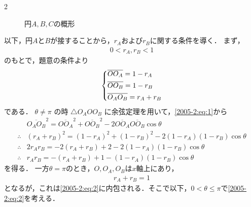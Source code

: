 \documentclass[../../main.tex]{subfiles}
\begin{document}
\begin{multicols}{2}
\begin{figure}[H]
    \caption{円$A,B,C$の概形}
  \end{figure}

  以下，円$A$と$B$が接することから，$r_A$および$r_B$に関する条件を導く．
  まず，
  \begin{align*}
    0 < r_A, r_B < 1
  \end{align*}
  のもとで，題意の条件より
  \begin{align}
    \begin{dcases}
      \overline{OO_A}    = 1-r_A \\
      \overline{OO_B}    = 1-r_B \\
      \overline{O_AO_B} = r_A+r_B
    \end{dcases}\label{2005-2:eq:1}
  \end{align}
  である．
  $\theta\neq\pi$ の時 $\triangle O_A O O_B$ に余弦定理を用いて，\cref{2005-2:eq:1}から
  \begin{align}
               & \overline{O_A O_B}^2 = \overline{OO_A}^2 + \overline{OO_B}^2 -2 \overline{OO_A}\overline{OO_B}\cos\theta \nonumber \\
    \therefore & (r_A+r_B)^2 = (1-r_A)^2 + (1-r_B)^2 - 2(1-r_A)(1-r_B)\cos\theta                                          \nonumber \\
    \therefore & 2r_A r_B = -2(r_A+r_B) + 2 - 2(1-r_A)(1-r_B)\cos\theta       \nonumber                                             \\
    \therefore & r_A r_B = -(r_A+r_B) + 1 - (1-r_A)(1-r_B)\cos\theta    \label{2005-2:eq:2}
  \end{align}
  を得る．
  一方$\theta=\pi$のとき，$O,O_A,O_B$は$x$軸上にあり，
  \begin{align*}
    r_A+r_B = 1
  \end{align*}
  となるが，これは\cref{2005-2:eq:2}に内包される．そこで以下，$0<\theta\le\pi$で\cref{2005-2:eq:2}を考える．


\end{multicols}
\end{document}
